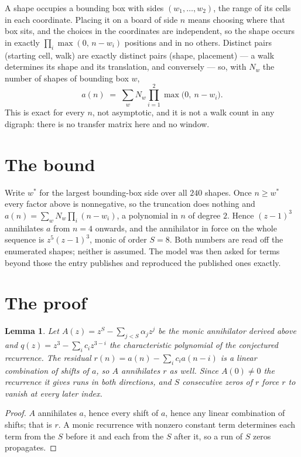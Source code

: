 \documentclass[11pt,a4paper]{article}
\theoremstyle{plain}
\newtheorem{lemma}[theorem]{Lemma}
\theoremstyle{definition}
\begin{document}
A shape occupies a bounding box with sides $(w_1,\dots,w_{2})$, the range of its cells in each
coordinate. Placing it on a board of side $n$ means choosing where that box sits, and the
choices in the coordinates are independent, so the shape occurs in exactly
$\prod_{i}\max(0,\,n-w_i)$ positions and in no others. Distinct pairs (starting cell,
walk) are exactly distinct pairs (shape, placement) --- a walk determines its shape and its
translation, and conversely --- so, with $N_w$ the number of shapes of bounding box $w$,
\[
a(n)\;=\;\sum_{w} N_w \prod_{i=1}^{2}\max\bigl(0,\ n-w_i\bigr).
\]
This is exact for every $n$, not asymptotic, and it is not a walk count in any digraph: there is
no transfer matrix here and no window.

\section{The bound}

Write $w^\ast$ for the largest bounding-box side over all $240$ shapes. Once $n\ge w^\ast$
every factor above is nonnegative, so the truncation does nothing and
$a(n)=\sum_w N_w\prod_i(n-w_i)$, a polynomial in $n$ of degree $2$. Hence $(z-1)^{3}$
annihilates $a$ from $n=4$ onwards, and the annihilator in force on the whole sequence is
$z^{5}(z-1)^{3}$, monic of order $S=8$. Both numbers are read off the enumerated
shapes; neither is assumed. The model was then asked for terms beyond those the entry publishes
and reproduced the published ones exactly.

\section{The proof}

\begin{lemma}\label{lem:crit}
Let $A(z)=z^S-\sum_{j<S}\alpha_jz^{j}$ be the monic annihilator derived above and
$q(z)=z^{3}-\sum_ic_iz^{3-i}$ the characteristic polynomial of the conjectured
recurrence. The residual $r(n)=a(n)-\sum_ic_ia(n-i)$ is a linear combination of shifts of $a$,
so $A$ annihilates $r$ as well. Since $A(0)\ne0$ the recurrence it gives runs in both
directions, and $S$ consecutive zeros of $r$ force $r$ to vanish at every later index.
\end{lemma}

\begin{proof}
$A$ annihilates $a$, hence every shift of $a$, hence any linear combination of shifts; that is
$r$. A monic recurrence with nonzero constant term determines each term from the $S$ before it
and each from the $S$ after it, so a run of $S$ zeros propagates.
\end{proof}
\end{document}
